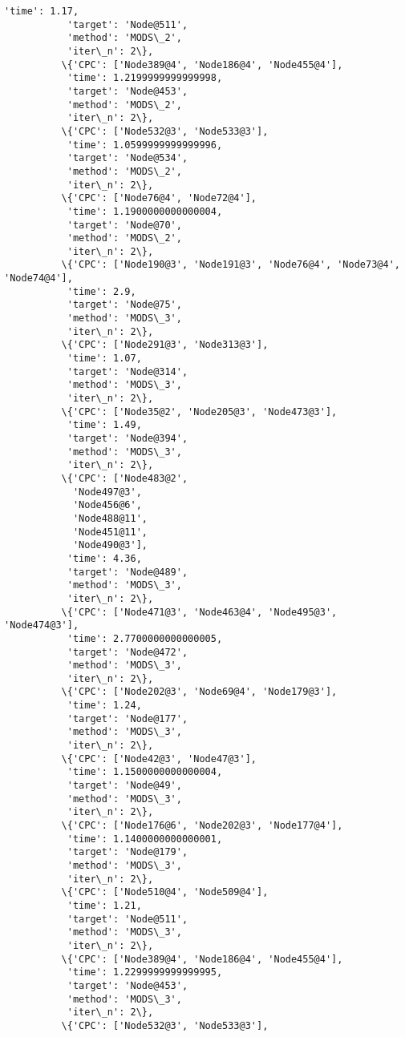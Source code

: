 \documentclass[11pt]{article}
\begin{document}
\begin{Verbatim}[commandchars=\\\{\}]
           'time': 1.17,
           'target': 'Node@511',
           'method': 'MODS\_2',
           'iter\_n': 2\},
          \{'CPC': ['Node389@4', 'Node186@4', 'Node455@4'],
           'time': 1.2199999999999998,
           'target': 'Node@453',
           'method': 'MODS\_2',
           'iter\_n': 2\},
          \{'CPC': ['Node532@3', 'Node533@3'],
           'time': 1.0599999999999996,
           'target': 'Node@534',
           'method': 'MODS\_2',
           'iter\_n': 2\},
          \{'CPC': ['Node76@4', 'Node72@4'],
           'time': 1.1900000000000004,
           'target': 'Node@70',
           'method': 'MODS\_2',
           'iter\_n': 2\},
          \{'CPC': ['Node190@3', 'Node191@3', 'Node76@4', 'Node73@4', 'Node74@4'],
           'time': 2.9,
           'target': 'Node@75',
           'method': 'MODS\_3',
           'iter\_n': 2\},
          \{'CPC': ['Node291@3', 'Node313@3'],
           'time': 1.07,
           'target': 'Node@314',
           'method': 'MODS\_3',
           'iter\_n': 2\},
          \{'CPC': ['Node35@2', 'Node205@3', 'Node473@3'],
           'time': 1.49,
           'target': 'Node@394',
           'method': 'MODS\_3',
           'iter\_n': 2\},
          \{'CPC': ['Node483@2',
            'Node497@3',
            'Node456@6',
            'Node488@11',
            'Node451@11',
            'Node490@3'],
           'time': 4.36,
           'target': 'Node@489',
           'method': 'MODS\_3',
           'iter\_n': 2\},
          \{'CPC': ['Node471@3', 'Node463@4', 'Node495@3', 'Node474@3'],
           'time': 2.7700000000000005,
           'target': 'Node@472',
           'method': 'MODS\_3',
           'iter\_n': 2\},
          \{'CPC': ['Node202@3', 'Node69@4', 'Node179@3'],
           'time': 1.24,
           'target': 'Node@177',
           'method': 'MODS\_3',
           'iter\_n': 2\},
          \{'CPC': ['Node42@3', 'Node47@3'],
           'time': 1.1500000000000004,
           'target': 'Node@49',
           'method': 'MODS\_3',
           'iter\_n': 2\},
          \{'CPC': ['Node176@6', 'Node202@3', 'Node177@4'],
           'time': 1.1400000000000001,
           'target': 'Node@179',
           'method': 'MODS\_3',
           'iter\_n': 2\},
          \{'CPC': ['Node510@4', 'Node509@4'],
           'time': 1.21,
           'target': 'Node@511',
           'method': 'MODS\_3',
           'iter\_n': 2\},
          \{'CPC': ['Node389@4', 'Node186@4', 'Node455@4'],
           'time': 1.2299999999999995,
           'target': 'Node@453',
           'method': 'MODS\_3',
           'iter\_n': 2\},
          \{'CPC': ['Node532@3', 'Node533@3'],

\end{Verbatim}
\end{document}
